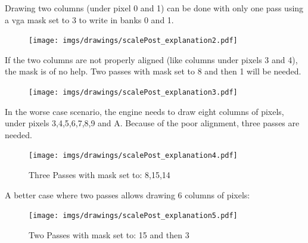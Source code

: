  Drawing two columns (under pixel 0 and 1) can be done with only one pass using a vga mask set to 3 to write in banks 0 and 1.\\
 \par
 \begin{minipage}{\textwidth}

\end{minipage}
\par

 \begin{figure}[H]
 \centering
 \texttt{[image: imgs/drawings/scalePost\_explanation2.pdf]}
 \end{figure}





If the two columns are not properly aligned (like columns under pixels 3 and 4), the mask is of no help. Two passes with mask set to 8 and then 1 will be needed.\\
 \par
 \begin{minipage}{\textwidth}

\end{minipage}
\par
  \begin{figure}[H]
 \centering
 \texttt{[image: imgs/drawings/scalePost\_explanation3.pdf]}
 \end{figure}


In the worse case scenario, the engine needs to draw eight columns of pixels, under pixels 3,4,5,6,7,8,9 and A. Because of the poor alignment, three passes are needed.\\
 \par
 \begin{minipage}{\textwidth}

\end{minipage}
\par
  \begin{figure}[H]
 \centering
 \texttt{[image: imgs/drawings/scalePost\_explanation4.pdf]}
 \caption{Three Passes with mask set to: 8,15,14}
 \end{figure}


A better case where two passes allows drawing 6 columns of pixels:\\
 \par
 \begin{minipage}{\textwidth}

\end{minipage}
\par
   \begin{figure}[H]
 \centering
 \texttt{[image: imgs/drawings/scalePost\_explanation5.pdf]}
  \caption{Two Passes with mask set to: 15 and then 3}
 \end{figure}






